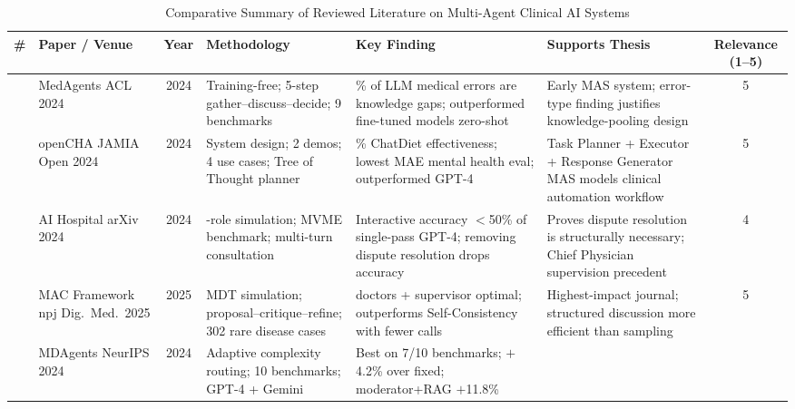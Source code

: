 \begin{table}[p]
\centering
\caption{Comparative Summary of Reviewed Literature on Multi-Agent Clinical AI Systems}
\label{tab:summary}
\begin{adjustbox}{max width=\textwidth, max totalheight=0.93\textheight, keepaspectratio}
\begin{tabular}{%
  c
  >{\raggedright\arraybackslash}p{2.4cm}
  c
  >{\raggedright\arraybackslash}p{3.5cm}
  >{\raggedright\arraybackslash}p{3.9cm}
  >{\raggedright\arraybackslash}p{3.4cm}
  c}
\toprule
\textbf{\#} &
\textbf{Paper / Venue} &
\textbf{Year} &
\textbf{Methodology} &
\textbf{Key Finding} &
\textbf{Supports Thesis} &
\textbf{Relevance (1--5)} \\
\midrule
\cite{Tang2024MedAgents}
  & MedAgents \newline ACL 2024
  & 2024
  & Training-free; 5-step gather--discuss--decide; 9 benchmarks
  & 77\% of LLM medical errors are knowledge gaps; outperformed fine-tuned models zero-shot
  & Early MAS system; error-type finding justifies knowledge-pooling design
  & 5 \\[3pt]
\cite{Abbasian2024openCHA}
  & openCHA \newline JAMIA Open 2024
  & 2024
  & System design; 2 demos; 4 use cases; Tree of Thought planner
  & 92\% ChatDiet effectiveness; lowest MAE mental health eval; outperformed GPT-4
  & Task Planner + Executor + Response Generator MAS models clinical automation workflow
  & 5 \\[3pt]
\cite{Fan2024AIHospital}
  & AI Hospital \newline arXiv 2024
  & 2024
  & 4-role simulation; MVME benchmark; multi-turn consultation
  & Interactive accuracy $<$50\% of single-pass GPT-4; removing dispute resolution drops accuracy
  & Proves dispute resolution is structurally necessary; Chief Physician supervision precedent
  & 4 \\[3pt]
\cite{MAC2025npj}
  & MAC Framework \newline npj Dig.\ Med.\ 2025
  & 2025
  & MDT simulation; proposal--critique--refine; 302 rare disease cases
  & 4 doctors + supervisor optimal; outperforms Self-Consistency with fewer calls
  & Highest-impact journal; structured discussion more efficient than sampling
  & 5 \\[3pt]
\cite{Kim2024MDAgents}
  & MDAgents \newline NeurIPS 2024
  & 2024
  & Adaptive complexity routing; 10 benchmarks; GPT-4 + Gemini
  & Best on 7/10 benchmarks; $+$4.2\% over fixed; moderator+RAG $+$11.8\%

\end{tabular}
\end{adjustbox}
\end{table}
